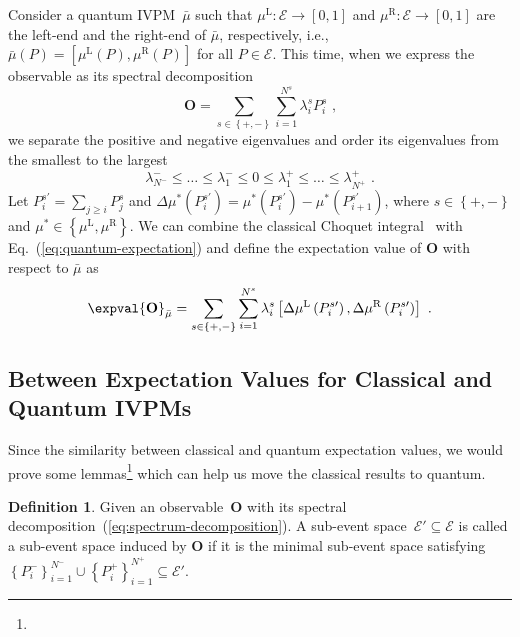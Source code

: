\documentclass[12pt]{iopart}
\theoremstyle{plain}
\theoremstyle{definition}
\newtheorem{definition}[thm]{Definition}
\theoremstyle{remark}
\newcommand{\events}{\ensuremath{\mathcal{E}}}
\newcommand{\yutsung}[1]{\fbox{\begin{minipage}{0.9\textwidth}\color{purple}{Yu-Tsung says: #1}\end{minipage}}}
\newcommand{\mul}[1][]{\ensuremath{\mu^{\mathrm{L{#1}}}}}
\newcommand{\mur}[1][]{\ensuremath{\mu^{\mathrm{R{#1}}}}}
\begin{document}
Consider a quantum IVPM~$\bar{\mu}$ such that $\mul:\events\rightarrow\left[0,1\right]$
and $\mur:\events\rightarrow\left[0,1\right]$ are the left-end and
the right-end of $\bar{\mu}$, respectively, i.e., $\bar{\mu}\left(P\right)=\left[\mul\left(P\right),\mur\left(P\right)\right]$
for all $P\in\events$. This time, when we express the observable
as its spectral decomposition
\begin{equation}
\mathbf{O}=\sum_{s\in\left\{ +,-\right\} }\sum_{i=1}^{N^{s}}\lambda_{i}^{s}P_{i}^{s}\textrm{ ,}\label{eq:spectrum-decomposition}
\end{equation}
we separate the positive and negative eigenvalues and order its eigenvalues
from the smallest to the largest 
\begin{equation}
\lambda_{N^{-}}^{-}\le\ldots\le\lambda_{1}^{-}\le0\le\lambda_{1}^{+}\le\ldots\le\lambda_{N^{+}}^{+}\textrm{ .}
\end{equation}
Let $P_{i}^{s\prime}=\sum_{j\ge i}P_{j}^{s}$ and $\Delta\mu^{*}\left(P_{i}^{s\prime}\right)=\mu^{*}\left(P_{i}^{s\prime}\right)-\mu^{*}\left(P_{i+1}^{s\prime}\right)$,
where $s\in\left\{ +,-\right\} $ and $\mu^{*}\in\left\{ \mul,\mur\right\} $.
We can combine the classical Choquet integral~\cite{Vitali1925,Choquet1954,GilboaSchmeidler1994,Grabisch2016}
with Eq.~(\ref{eq:quantum-expectation}) and define the expectation
value of $\mathbf{O}$ with respect to $\bar{\mu}$ as
\begin{equation}
\expval{\mathbf{O}}_{\bar{\mu}}=\sum_{s\in\left\{ +,-\right\} }\sum_{i=1}^{N^{s}}\lambda_{i}^{s}\left[\Delta\mul\left(P_{i}^{s\prime}\right),\Delta\mur\left(P_{i}^{s\prime}\right)\right]\textrm{ .}\label{eq:quantum-interval-expectation}
\end{equation}

\subsection{Between Expectation Values for Classical and Quantum IVPMs\label{subsec:Between-Expectation-Values-Classical-Quantum}}

Since the similarity between classical and quantum expectation values,
we would prove some lemmas\footnote{\yutsung{functor?}} which can
help us move the classical results to quantum.

\begin{definition}Given an observable~$\mathbf{O}$ with its spectral
decomposition~(\ref{eq:spectrum-decomposition}). A sub-event space~$\events'\subseteq\events$
is called a sub-event space induced by $\mathbf{O}$ if it is the
minimal sub-event space satisfying $\left\{ P_{i}^{-}\right\} _{i=1}^{N^{-}}\cup\left\{ P_{i}^{+}\right\} _{i=1}^{N^{+}}\subseteq\events'$.\end{definition}
\end{document}
